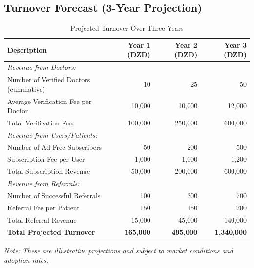 \subsection{Turnover Forecast (3-Year Projection)}
\begin{table}[H]
  \centering
  \caption{Projected Turnover Over Three Years}
  \label{tab:turnover_forecast}
  \begin{tabularx}{\linewidth}{@{} X r r r @{}}
    \toprule
    \rowcolor{Gray}\textbf{Description} & \textbf{Year 1 (DZD)} & \textbf{Year 2 (DZD)} & \textbf{Year 3 (DZD)} \\
    \midrule
    \textit{Revenue from Doctors:} & & & \\
    Number of Verified Doctors (cumulative) & 10 & 25 & 50 \\
    Average Verification Fee per Doctor & 10,000 & 10,000 & 12,000 \\
    \quad Total Verification Fees & 100,000 & 250,000 & 600,000 \\
    \midrule
    \textit{Revenue from Users/Patients:} & & & \\
    Number of Ad-Free Subscribers & 50 & 200 & 500 \\
    Subscription Fee per User & 1,000 & 1,000 & 1,200 \\
    \quad Total Subscription Revenue & 50,000 & 200,000 & 600,000 \\
    \midrule
    \textit{Revenue from Referrals:} & & & \\
    Number of Successful Referrals & 100 & 300 & 700 \\
    Referral Fee per Patient & 150 & 150 & 200 \\
    \quad Total Referral Revenue & 15,000 & 45,000 & 140,000 \\
    \midrule
    \rowcolor{Gray}\textbf{Total Projected Turnover} & \textbf{165,000} & \textbf{495,000} & \textbf{1,340,000} \\
    \bottomrule
  \end{tabularx}
  \footnotesize{\textit{Note: These are illustrative projections and subject to market conditions and adoption rates.}}
\end{table}

